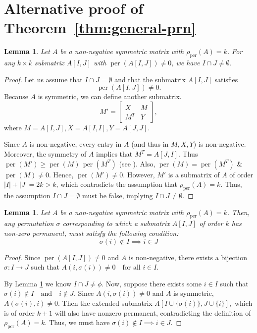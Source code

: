 \documentclass[11pt]{article}
\DeclareMathOperator{\per}{per}
\theoremstyle{plain}
\newtheorem{lemma}[theorem]{Lemma}
\theoremstyle{definition}
\theoremstyle{remark}
\begin{document}
\appendix
\section{Alternative proof of Theorem~\ref{thm:general-prn}} \label{appendix}

\begin{lemma}\label{lemma:app-nonempty-intersection}
Let $A$ be a non-negative symmetric matrix with $\rho_{\operatorname{per}}(A) = k$. For any $k \times k$ submatrix $A[I,J]$ with $\operatorname{per}(A[I,J]) \neq 0$, we have $I \cap J \neq \emptyset$.
\end{lemma}
\begin{proof}
Let us assume that \( I \cap J = \emptyset \) and that the submatrix \( A[I, J] \) satisfies
\[
\per(A[I, J]) \neq 0.
\]
Because \( A \) is symmetric, we can define another submatrix.
\[
M' = \begin{bmatrix} X & M \\ M^T & Y \end{bmatrix},
\]
where 
\(
M = A[I, J], X = A[I, I], Y = A[J, J].
\)


 Since \( A \) is non-negative, every entry in \( A \) (and thus in \( M, X, Y \)) is non-negative. Moreover, the symmetry of \( A \) implies that \( M^T = A[J, I] \). Thus \(
\per(M') \geq \per(M) \, \per(M^T)
\) (see \cite{minc1984permanents}).
Also,
\(\per(M) = \per(M^T)\) \& \( \per(M) \neq 0. \) Hence,
\(\per(M') \neq 0.\) However, \( M' \) is a submatrix of \( A \) of order \( |I| + |J| = 2k > k \), which contradicts the assumption that \( \rho_{\per}(A) = k \). Thus, the assumption \( I \cap J = \emptyset \) must be false, implying
\(
I \cap J \neq \emptyset.
\) 
\end{proof}

\begin{lemma}\label{lemma:app-bijection-constraint}
  Let \( A \) be a non-negative symmetric matrix with \( \rho_{\per}(A) = k \). 
  Then, any permutation $\sigma$ corresponding to which a submatrix $A[I, J]$ of order $k$ has non-zero permanent, must satisfy the following condition:
    \[ \sigma(i) \notin I \implies i \in J\]
\end{lemma}

\begin{proof}
Since \( \per(A[I, J]) \neq 0 \) and \( A \) is non-negative, there exists a bijection 
$
\sigma: I \to J
$
such that
$
A(i, \sigma(i)) \neq 0 \quad \text{for all } i \in I.
$


By Lemma \ref{lemma:app-nonempty-intersection} we know \( I \cap J \neq \phi \). Now, suppose there exists some \( i \in I \) such that
$
\sigma(i) \notin I \quad \text{and} \quad i \notin J.
$
 Since \( A(i, \sigma(i)) \neq 0 \) and $A$ is symmetric, \( A(\sigma(i),i) \neq 0 \). Then the extended submatrix
$
A[I \cup \{\sigma(i)\}, J \cup \{i\}],
$
which is of order \( k+1 \) will also have nonzero permanent, contradicting the definition of \( \rho_{\per}(A) = k \).
Thus, we must have
$
\sigma(i) \notin I \implies i \in  J.$
\end{proof}
\end{document}
